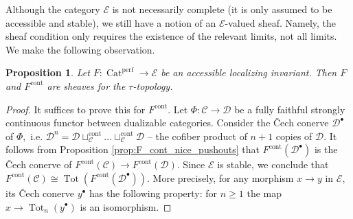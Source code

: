 \documentclass[11pt,leqno]{amsart}
\newtheorem{prop}[theo]{Proposition}
\numberwithin{equation}{section}
\newcommand{\Cat}{\operatorname{Cat}}
\newcommand{\cont}{\operatorname{cont}}
\newcommand{\st}{\operatorname{st}}
\newcommand{\dual}{\operatorname{dual}}
\newcommand{\cF}{{\mathcal F}}
\newcommand{\cD}{{\mathcal D}}
\newcommand{\cA}{{\mathcal A}}
\newcommand{\cC}{{\mathcal C}}
\newcommand{\cE}{{\mathcal E}}
\newcommand{\Tot}{\operatorname{Tot}}
\newcommand{\perf}{\operatorname{perf}}
\newcommand{\Sh}{\operatorname{Shv}}
\newcommand{\Ind}{\operatorname{Ind}}
\begin{document}
Although the category $\cE$ is not necessarily complete (it is only assumed to be accessible and stable), we still have a notion of an $\cE$-valued sheaf. Namely, the sheaf condition only requires the existence of the relevant limits, not all limits. We make the following observation.

\begin{prop}\label{prop:loc_invar_is_a_sheaf} Let $F:\Cat^{\perf}\to\cE$ be an accessible localizing invariant. Then $F$ and $F^{\cont}$ are sheaves for the $\tau$-topology.\end{prop}

\begin{proof}It suffices to prove this for $F^{\cont}.$ Let $\Phi:\cC\to\cD$ be a fully faithful strongly continuous functor between dualizable categories. Consider the \v{C}ech conerve $\cD^{\bullet}$ of $\Phi,$ i.e. $\cD^n=\cD\sqcup_{\cC}^{\cont}\dots\sqcup_{\cC}^{\cont}\cD$ -- the cofiber product of $n+1$ copies of $\cD.$ It follows from Proposition \ref{prop:F_cont_nice_pushouts} that $F^{\cont}(\cD^{\bullet})$ is the \v{C}ech conerve of $F^{\cont}(\cC)\to F^{\cont}(\cD).$ Since $\cE$ is stable, we conclude that $F^{\cont}(\cC)\cong \Tot(F^{\cont}(\cD^{\bullet})).$
More precisely, for any morphism $x\to y$ in $\cE,$ its \v{C}ech conerve $y^{\bullet}$ has the following property: for $n\geq 1$ the map $x\to\Tot_n(y^{\bullet})$ is an isomorphism.
\end{proof}



\end{document}
